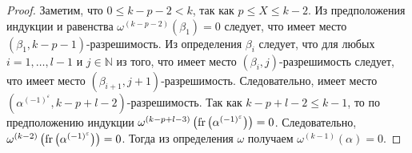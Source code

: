 \documentclass[_00_dissertation.tex]{subfiles}
\begin{document}
\begin{proof}
    Заметим, что $0 \le k-p-2 < k$, так как $p \le X \le k-2$.
    Из предположения индукции и равенства $\omega^{(k-p-2)}\left(\beta_1\right) = 0$ следует, что имеет место $\left(\beta_1, k-p-1\right)$-разрешимость.
    Из определения $\beta_i$ следует, что для любых $i = 1, \dots, l-1$ и $j \in \mathbb{N}$ из того, что имеет место $(\beta_i, j)$-разрешимость следует, что имеет место $(\beta_{i+1}, j+1)$-разрешимость.
    Следовательно, имеет место $\left(\alpha^{(-1)^{\varepsilon}}, k-p+l-2\right)$-разрешимость.
    Так как $k - p + l - 2 \le k - 1$, то по предположению индукции $\omega^{(k-p+l-3)}\left(\textrm{fr}\left(\alpha^{(-1)^{\varepsilon}}\right)\right) = 0$.
    Следовательно, $\omega^{(k-2)}\left(\textrm{fr}\left(\alpha^{(-1)^{\varepsilon}}\right)\right) = 0$.
    Тогда из определения $\omega$ получаем $\omega^{(k-1)}(\alpha) = 0$.
\end{proof}
\end{document}
